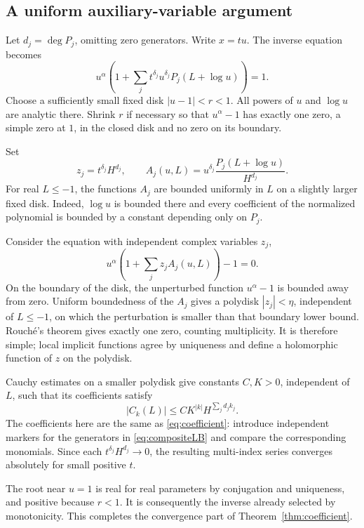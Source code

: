 \documentclass[11pt,a4paper]{article}
\numberwithin{equation}{section}
\theoremstyle{definition}\newtheorem{definition}[theorem]{Definition}
\theoremstyle{remark}\newtheorem{remark}[theorem]{Remark}
\begin{document}
\subsection{A uniform auxiliary-variable argument}
Let $d_j=\deg P_j$, omitting zero generators. Write $x=tu$. The inverse equation becomes
\begin{equation}\label{eq:uimplicit}
u^\alpha\left(1+\sum_j t^{\delta_j}u^{\delta_j}
P_j(L+\log u)\right)=1.
\end{equation}
Choose a sufficiently small fixed disk $|u-1|<r<1$. All powers of $u$ and $\log u$ are analytic there. Shrink $r$ if necessary so that $u^\alpha-1$ has exactly one zero, a simple zero at $1$, in the closed disk and no zero on its boundary.

Set
\[
z_j=t^{\delta_j}H^{d_j},\qquad
A_j(u,L)=u^{\delta_j}\frac{P_j(L+\log u)}{H^{d_j}}.
\]
For real $L\le-1$, the functions $A_j$ are bounded uniformly in $L$ on a slightly larger fixed disk. Indeed, $\log u$ is bounded there and every coefficient of the normalized polynomial is bounded by a constant depending only on $P_j$.

Consider the equation with independent complex variables $z_j$,
\[
u^\alpha\left(1+\sum_jz_jA_j(u,L)\right)-1=0.
\]
On the boundary of the disk, the unperturbed function $u^\alpha-1$ is bounded away from zero. Uniform boundedness of the $A_j$ gives a polydisk $|z_j|<\eta$, independent of $L\le-1$, on which the perturbation is smaller than that boundary lower bound. Rouch\'e's theorem gives exactly one zero, counting multiplicity. It is therefore simple; local implicit functions agree by uniqueness and define a holomorphic function of $z$ on the polydisk.

Cauchy estimates on a smaller polydisk give constants $C,K>0$, independent of $L$, such that its coefficients satisfy
\begin{equation}\label{eq:coeffbound}
|C_k(L)|\le C K^{|k|}H^{\sum_jd_jk_j}.
\end{equation}
The coefficients here are the same as \eqref{eq:coefficient}: introduce independent markers for the generators in \eqref{eq:compositeLB} and compare the corresponding monomials. Since each $t^{\delta_j}H^{d_j}\to0$, the resulting multi-index series converges absolutely for small positive $t$.

The root near $u=1$ is real for real parameters by conjugation and uniqueness, and positive because $r<1$. It is consequently the inverse already selected by monotonicity. This completes the convergence part of Theorem~\ref{thm:coefficient}.
\end{document}

